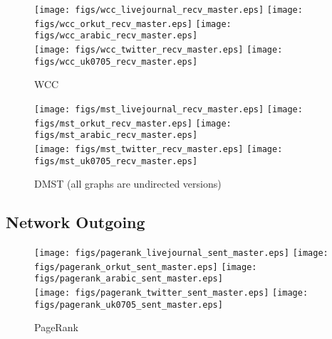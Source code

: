 \documentclass{article}
\newcommand{\bline}[1][1]{\vspace{#1\baselineskip}}
\begin{document}
\begin{figure}[!h]
  \bline[3.5]
  \centering
  \texttt{[image: figs/wcc\_livejournal\_recv\_master.eps]}\hspace{1em}%
  \texttt{[image: figs/wcc\_orkut\_recv\_master.eps]}\hspace{1em}%
  \texttt{[image: figs/wcc\_arabic\_recv\_master.eps]}\\
  \texttt{[image: figs/wcc\_twitter\_recv\_master.eps]}\hspace{1em}%
  \texttt{[image: figs/wcc\_uk0705\_recv\_master.eps]}
  \caption{WCC}
\end{figure}

\begin{figure}[!h]
  \bline[3.5]
  \centering
  \texttt{[image: figs/mst\_livejournal\_recv\_master.eps]}\hspace{1em}%
  \texttt{[image: figs/mst\_orkut\_recv\_master.eps]}\hspace{1em}%
  \texttt{[image: figs/mst\_arabic\_recv\_master.eps]}\\
  \texttt{[image: figs/mst\_twitter\_recv\_master.eps]}\hspace{1em}%
  \texttt{[image: figs/mst\_uk0705\_recv\_master.eps]}
  \caption{DMST (all graphs are undirected versions)}
\end{figure}

\pagebreak
\subsection{Network Outgoing}
\begin{figure}[!h]
  \bline[1]
  \centering
  \texttt{[image: figs/pagerank\_livejournal\_sent\_master.eps]}\hspace{1em}%
  \texttt{[image: figs/pagerank\_orkut\_sent\_master.eps]}\hspace{1em}%
  \texttt{[image: figs/pagerank\_arabic\_sent\_master.eps]}\\
  \texttt{[image: figs/pagerank\_twitter\_sent\_master.eps]}\hspace{1em}%
  \texttt{[image: figs/pagerank\_uk0705\_sent\_master.eps]}
  \caption{PageRank}
\end{figure}
\end{document}
